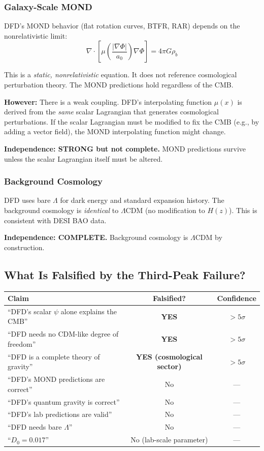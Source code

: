 \documentclass[11pt,a4paper]{article}
\begin{document}
\subsubsection{Galaxy-Scale MOND}

DFD's MOND behavior (flat rotation curves, BTFR, RAR) depends on the nonrelativistic limit:
\begin{equation}
\nabla\cdot\left[\mu\left(\frac{|\nabla\Phi|}{a_0}\right)\nabla\Phi\right] = 4\pi G\rho_b
\end{equation}

This is a \emph{static, nonrelativistic} equation. It does not reference cosmological perturbation theory. The MOND predictions hold regardless of the CMB.

\textbf{However:} There is a weak coupling. DFD's interpolating function $\mu(x)$ is derived from the \emph{same} scalar Lagrangian that generates cosmological perturbations. If the scalar Lagrangian must be modified to fix the CMB (e.g., by adding a vector field), the MOND interpolating function might change.

\textbf{Independence: STRONG but not complete.} MOND predictions survive unless the scalar Lagrangian itself must be altered.

\subsubsection{Background Cosmology}

DFD uses bare $\Lambda$ for dark energy and standard expansion history. The background cosmology is \emph{identical} to $\Lambda$CDM (no modification to $H(z)$). This is consistent with DESI BAO data.

\textbf{Independence: COMPLETE.} Background cosmology is $\Lambda$CDM by construction.

\subsection{What Is Falsified by the Third-Peak Failure?}

\begin{center}
\begin{tabular}{lcc}
\toprule
\textbf{Claim} & \textbf{Falsified?} & \textbf{Confidence} \\
\midrule
``DFD's scalar $\psi$ alone explains the CMB'' & \textbf{YES} & $>5\sigma$ \\
``DFD needs no CDM-like degree of freedom'' & \textbf{YES} & $>5\sigma$ \\
``DFD is a complete theory of gravity'' & \textbf{YES (cosmological sector)} & $>5\sigma$ \\
``DFD's MOND predictions are correct'' & No & --- \\
``DFD's quantum gravity is correct'' & No & --- \\
``DFD's lab predictions are valid'' & No & --- \\
``DFD needs bare $\Lambda$'' & No & --- \\
``$D_0 = 0.017$'' & No (lab-scale parameter) & --- \\
\bottomrule
\end{tabular}
\end{center}
\end{document}
